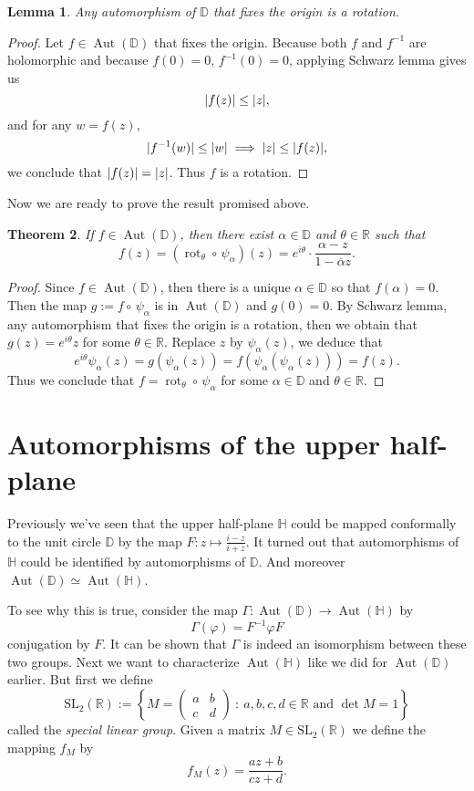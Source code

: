 \documentclass{article}
\DeclarePairedDelimiter\abs{\lvert}{\rvert}
\theoremstyle{plain}
\newtheorem{theorem}{Theorem}
\newtheorem{lemma}[theorem]{Lemma}
\theoremstyle{remark}
\DeclareMathOperator{\Aut}{Aut}
\DeclareMathOperator{\rot}{rot}
\def\inv{^{-1}}
\def\SL{\text{SL}_2(\mathbb R)}
\def\H{\mathbb{H}}
\def\D{\mathbb{D}}
\def\R{\mathbb{R}}
\begin{document}
\noindent\hrulefill
\begin{lemma}
  Any automorphism of $\D$ that fixes the origin is a rotation.
\end{lemma}
\noindent\hrulefill
\begin{proof}
  Let $f\in\Aut(\D)$ that fixes the origin. Because both $f$ and $f\inv$ are holomorphic
  and because $f(0)=0$, $f\inv(0)=0$, applying Schwarz lemma gives us
  \[\abs{f(z)}\leq \abs{z}, \]
  and for any $w=f(z)$,
  \[
    \abs{f\inv(w)}\leq \abs{w} \implies \abs{z}\leq \abs{f(z)},
  \]
  we conclude that $\abs{f(z)}=\abs{z}$. Thus $f$ is a rotation.
\end{proof}

Now we are ready to prove the result promised above.

\noindent\hrulefill
\begin{theorem}
  If $f\in\Aut(\D)$, then there exist $\alpha\in\D$ and $\theta\in\R$ such that
  \[
    f(z)
    = (\rot_\theta\circ\,\psi_\alpha)(z)
    = e^{i\theta}\cdot\frac{\alpha-z}{1-\overline{\alpha}z}.
  \]
\end{theorem}
\noindent\hrulefill
\begin{proof}
  Since $f\in\Aut(\D)$, then there is a unique $\alpha\in\D$ so that $f(\alpha)=0$.
  Then the map $g:=f\circ\,\psi_\alpha$ is in $\Aut(\D)$ and $g(0)=0$.
  By Schwarz lemma, any automorphism that fixes the origin is a rotation, then
  we obtain that $g(z)=e^{i\theta}z$ for some $\theta\in\R$. Replace $z$ by $\psi_\alpha(z)$,
  we deduce that
  \[
    e^{i\theta}\psi_\alpha(z) = g(\psi_{\alpha}(z))= f(\psi_\alpha(\psi_\alpha(z)))=f(z).
  \]
  Thus we conclude that $f=\rot_\theta\circ\,\psi_\alpha$ for some $\alpha\in\D$
  and $\theta\in\R$.
\end{proof}

\section{Automorphisms of the upper half-plane}
Previously we've seen that the upper half-plane $\H$ could be mapped
conformally to the unit circle $\D$ by the map
$F: z\mapsto \frac{i-z}{i+z}$. It turned out that automorphisms of $\H$
could be identified by automorphisms of $\D$. And moreover $\Aut(\D)\simeq\Aut(\H)$.

To see why this is true, consider the map
$\Gamma: \Aut(\D)\to \Aut(\H)$ by \[\Gamma(\varphi) = F\inv\varphi F\]
conjugation by $F$. It can be shown that $\Gamma$ is indeed an isomorphism between
these two groups. Next we want to characterize $\Aut(\H)$ like we did for $\Aut(\D)$
earlier. But first we define
\[
  \SL:=\left\{
    M= \begin{pmatrix} a&b\\c&d \end{pmatrix}~:~
    a,b,c,d\in\R \text{ and }
    \det M=1
  \right\}
\]
called the \emph{special linear group}. Given a matrix $M\in\SL$ we define the mapping
$f_M$ by
\[f_M(z)=\frac{az+b}{cz+d}.\]
\end{document}
